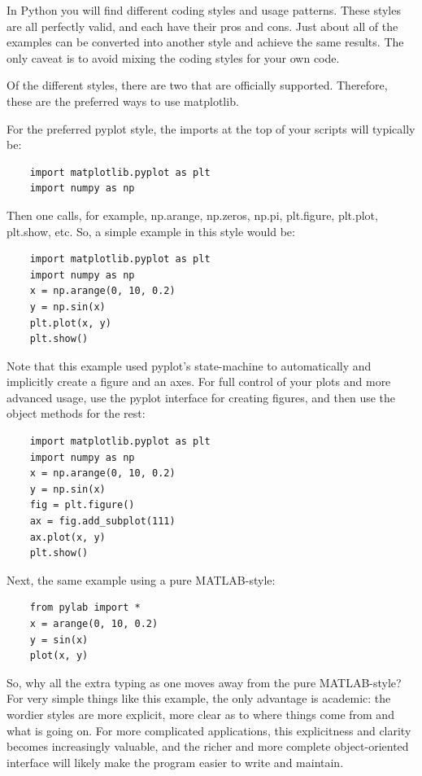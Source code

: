 In Python you will find different coding styles and usage patterns. These styles are all perfectly valid, and each have their pros and cons. Just about all of the examples can be converted into another style and achieve the same results. The only caveat is to avoid mixing the coding styles for your own code.

Of the different styles, there are two that are officially supported. Therefore, these are the preferred ways to use matplotlib.

For the preferred pyplot style, the imports at the top of your scripts will typically be:

\begin{lstlisting}
    import matplotlib.pyplot as plt
    import numpy as np
\end{lstlisting}

Then one calls, for example, np.arange, np.zeros, np.pi, plt.figure, plt.plot, plt.show, etc. So, a simple example in this style would be:

\begin{lstlisting}
    import matplotlib.pyplot as plt
    import numpy as np
    x = np.arange(0, 10, 0.2)
    y = np.sin(x)
    plt.plot(x, y)
    plt.show()
\end{lstlisting}

Note that this example used pyplot's state-machine to automatically and implicitly create a figure and an axes. For full control of your plots and more advanced usage, use the pyplot interface for creating figures, and then use the object methods for the rest:

\begin{lstlisting}
    import matplotlib.pyplot as plt
    import numpy as np
    x = np.arange(0, 10, 0.2)
    y = np.sin(x)
    fig = plt.figure()
    ax = fig.add_subplot(111)
    ax.plot(x, y)
    plt.show()
\end{lstlisting}

Next, the same example using a pure MATLAB-style:

\begin{lstlisting}
    from pylab import *
    x = arange(0, 10, 0.2)
    y = sin(x)
    plot(x, y)
\end{lstlisting}

So, why all the extra typing as one moves away from the pure MATLAB-style? For very simple things like this example, the only advantage is academic: the wordier styles are more explicit, more clear as to where things come from and what is going on. For more complicated applications, this explicitness and clarity becomes increasingly valuable, and the richer and more complete object-oriented interface will likely make the program easier to write and maintain.

